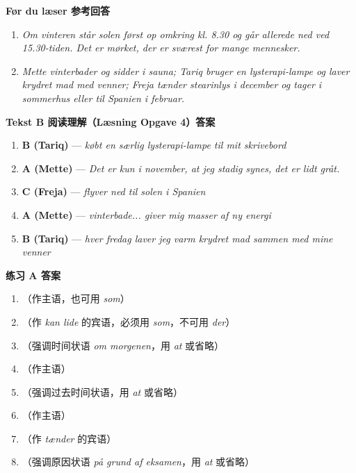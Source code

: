 \begin{answerbox}
\textbf{Før du læser 参考回答}
\begin{enumerate}
  \item \textit{Om vinteren står solen først op omkring kl. 8.30 og går allerede ned ved 15.30-tiden. Det er mørket, der er sværest for mange mennesker.}
  \item \textit{Mette vinterbader og sidder i sauna; Tariq bruger en lysterapi-lampe og laver krydret mad med venner; Freja tænder stearinlys i december og tager i sommerhus eller til Spanien i februar.}
\end{enumerate}

\textbf{Tekst B 阅读理解（Læsning Opgave 4）答案}
\begin{enumerate}
  \item \textbf{B (Tariq)} — \textit{købt en særlig lysterapi-lampe til mit skrivebord}
  \item \textbf{A (Mette)} — \textit{Det er kun i november, at jeg stadig synes, det er lidt gråt.}
  \item \textbf{C (Freja)} — \textit{flyver ned til solen i Spanien}
  \item \textbf{A (Mette)} — \textit{vinterbade... giver mig masser af ny energi}
  \item \textbf{B (Tariq)} — \textit{hver fredag laver jeg varm krydret mad sammen med mine venner}
\end{enumerate}

\textbf{练习 A 答案}
\begin{enumerate}
  \item {}（作主语，也可用 \textit{som}）
  \item {}（作 \textit{kan lide} 的宾语，必须用 \textit{som}，不可用 \textit{der}）
  \item {}（强调时间状语 \textit{om morgenen}，用 \textit{at} 或省略）
  \item {}（作主语）
  \item {}（强调过去时间状语，用 \textit{at} 或省略）
  \item {}（作主语）
  \item {}（作 \textit{tænder} 的宾语）
  \item {}（强调原因状语 \textit{på grund af eksamen}，用 \textit{at} 或省略）
\end{enumerate}


\end{answerbox}
